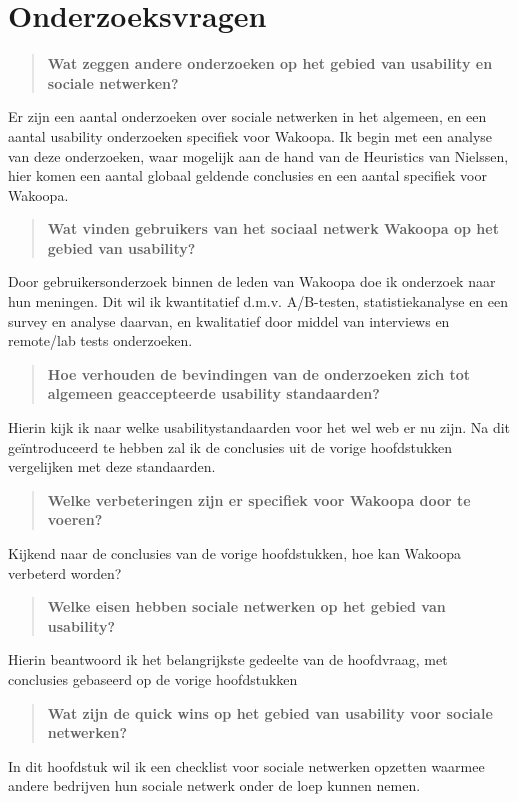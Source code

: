 \documentclass[a4paper, 10pt, twoside, pdftex]{article}
\begin{document}
\section{Onderzoeksvragen}
\begin{quote}
 \textbf{Wat zeggen andere onderzoeken op het gebied van usability en sociale netwerken?}
\end{quote}
Er zijn een aantal onderzoeken over sociale netwerken in het algemeen, en een aantal usability onderzoeken specifiek voor Wakoopa. Ik begin met een analyse van deze onderzoeken, waar mogelijk aan de hand van de Heuristics van Nielssen, hier komen een aantal globaal geldende conclusies en een aantal specifiek voor Wakoopa.
    
\begin{quote}
\textbf{Wat vinden gebruikers van het sociaal netwerk Wakoopa op het gebied van usability?}
\end{quote}
Door gebruikersonderzoek binnen de leden van Wakoopa doe ik onderzoek naar hun meningen. Dit wil ik kwantitatief d.m.v. A/B-testen, statistiekanalyse en een survey en analyse daarvan, en kwalitatief door middel van interviews en remote/lab tests onderzoeken.

    
\begin{quote}
\textbf{Hoe verhouden de bevindingen van de onderzoeken zich tot algemeen geaccepteerde usability standaarden?}
\end{quote}
Hierin kijk ik naar welke usabilitystandaarden voor het wel web er nu zijn. Na dit ge\"{i}ntroduceerd te hebben zal ik de conclusies uit de vorige hoofdstukken vergelijken met deze standaarden.

    
\begin{quote}
\textbf{Welke verbeteringen zijn er specifiek voor Wakoopa door te voeren?}
\end{quote}
Kijkend naar de conclusies van de vorige hoofdstukken, hoe kan Wakoopa verbeterd worden?

    
\begin{quote}
\textbf{Welke eisen hebben sociale netwerken op het gebied van usability?}
\end{quote}
Hierin beantwoord ik het belangrijkste gedeelte van de hoofdvraag, met conclusies gebaseerd op de vorige hoofdstukken


\begin{quote}
\textbf{Wat zijn de quick wins op het gebied van usability voor sociale netwerken?}
\end{quote}
In dit hoofdstuk wil ik een checklist voor sociale netwerken opzetten waarmee andere bedrijven hun sociale netwerk onder de loep kunnen nemen.
\end{document}
